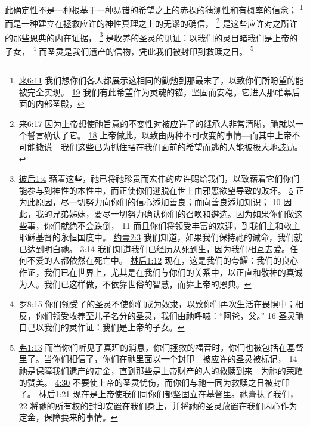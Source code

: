 \documentclass[12pt, a4paper, oneside]{ctexart}
\newcounter{parnum}[section]
\newcommand{\N}{%
   \noindent\refstepcounter{parnum}%
    \makebox[\parindent][l]{\textbf{\arabic{parnum}.}}}
\begin{document}
\N 此确定性不是一种根基于一种易错的希望之上的赤裸的猜测性和有概率的信念；
	\footnote {
		\href{https://biblehub.com/hebrews/6-11.htm}{来6:11} 我们想你们各人都展示这相同的勤勉到那最末了，以致你们所盼望的能被完全实现。
		\href{https://biblehub.com/hebrews/6-19.htm}{19} 我们有此希望作为灵魂的锚，坚固而安稳。它进入那帷幕后面的内部圣殿，
	}
	而是一种建立在拯救应许的神性真理之上的无谬的确信，
	\footnote {
		\href{https://biblehub.com/hebrews/6-17.htm}{来6:17} 因为上帝想使祂旨意的不变性对被应许了的继承人非常清晰，祂就以一个誓言确认了它。
		\href{https://biblehub.com/hebrews/6-18.htm}{18} 上帝做此，以致由两种不可改变的事情---而其中上帝不可能撒谎---我们这些已为抓住摆在我们面前的希望而逃的人能被极大地鼓励。
	}
	是这些应许对之所许的那些恩典的内在证据，
	\footnote {
		\href{https://biblehub.com/2_peter/1-4.htm}{彼后1:4} 藉着这些，祂已将祂珍贵而宏伟的应许赐给我们，以致藉着它们你们能参与到神性的本性中，而正使你们逃脱在世上由邪恶欲望导致的败坏。
		\href{https://biblehub.com/2_peter/1-5.htm}{5} 正为此原因，尽一切努力向你们的信心添加善良；而向善良添加知识；
		\href{https://biblehub.com/2_peter/1-10.htm}{10} 因此，我的兄弟姊妹，要尽一切努力确认你们的召唤和遴选。因为如果你们做这些事，你们就绝不会跌倒，
		\href{https://biblehub.com/2_peter/1-11.htm}{11} 而且你们将领受丰富的欢迎，到我们主和救主耶稣基督的永恒国度中。
		\href{https://biblehub.com/1_john/2-3.htm}{约壹2:3} 我们知道，如果我们保持祂的诫命，我们就已达到明白祂。
		\href{https://biblehub.com/1_john/3-14.htm}{3:14} 我们知道我们已经历从死到生，因为我们相互去爱。任何不爱的人都依然在死亡中。
		\href{https://biblehub.com/2_corinthians/1-12.htm}{林后1:12} 现在，这是我们的夸耀：我们的良心作证，我们已在世界上，尤其是在我们与你们的关系中，以正直和敬神的真诚为人。我们已这样做，不依靠世俗的智慧，而靠上帝的恩典。
	}
	是收养的圣灵的见证：以我们的灵目睹我们是上帝的子女，
	\footnote {
		\href{https://biblehub.com/romans/8-15.htm}{罗8:15} 你们领受了的圣灵不使你们成为奴隶，以致你们再次生活在畏惧中；相反，你们领受收养至儿子名分的圣灵，我们由祂呼喊：“阿爸，父。”
		\href{https://biblehub.com/romans/8-16.htm}{16} 圣灵祂自己以我们的灵作证：我们是上帝的子女。
	}
	而圣灵是我们遗产的信物，凭此我们被封印到救赎之日。
	\footnote {
		\href{https://biblehub.com/ephesians/1-13.htm}{弗1:13} 而当你们听见了真理的消息，你们拯救的福音时，你们也被包括在基督里了。当你们相信了，你们在祂里面以一个封印---被应许的圣灵被标记，
		\href{https://biblehub.com/ephesians/1-14.htm}{14} 祂是保障我们遗产的定金，直到那些是上帝财产的人的救赎到来---为祂的荣耀的赞美。
		\href{https://biblehub.com/ephesians/4-30.htm}{4:30} 不要使上帝的圣灵忧伤，而你们与祂一同为救赎之日被封印了。
		\href{https://biblehub.com/2_corinthians/1-21.htm}{林后1:21} 现在是上帝使我们同你们都坚固立在基督里。祂膏抹了我们，
		\href{https://biblehub.com/2_corinthians/1-22.htm}{22} 将祂的所有权的封印安置在我们身上，并将祂的圣灵放置在我们内心作为定金，保障要来的事情。
	}
\end{document}
